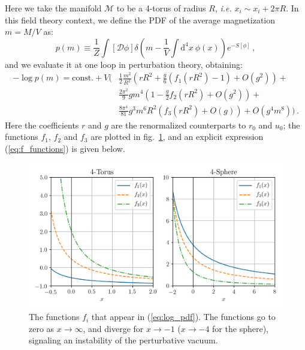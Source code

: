 \documentclass[11pt,a4paper]{article}
\newcommand{\dd}{\mathrm{d}}
\begin{document}
Here we take the manifold $\mathcal{M}$ to be a 4-torus of radius $R$,
\textit{i.e.} $x_i\sim x_i + 2\pi R$. In this field theory context, we define
the PDF of the average magnetization $m = M / V$ as:
\begin{equation}
    \label{eq:pdf_definition}
    p(m) \equiv \frac{1}{Z} \int \left[\mathcal{D}\phi\right]
    \delta\left(m - \frac{1}{V}\int\dd^4 x\ \phi(x)\right)
    e^{-S[\phi]}\,,
\end{equation}
and we evaluate it at one loop in perturbation theory, obtaining:
\begin{equation}
\label{eq:log_pdf}
\begin{split}
    -\log p(m) = \mathrm{const.} +  V\Bigg(
  &\frac{1}{2} \frac{m^2}{R^2} \left(
    r R^2 + \frac{g}{6} \left(f_1\left(r R^2\right) - 1\right)
    + O\left(g^2\right)\right) + \\
  & \frac{2\pi^2}{9}gm^4\left(
    1 - \frac{g}{2}f_2\left(r R^2\right)
    + O\left(g^2\right)\right) + \\
  & \frac{8\pi^4}{81} g^3 m^6 R^2\left(
    f_3\left(r R^2\right)
    + O\left(g\right)\right) + O\left(g^4m^8\right) \Bigg)\,.
\end{split}
\end{equation}
Here the coefficients $r$ and $g$ are the renormalized counterparts to $r_0$
and $u_0$; the functions $f_1$, $f_2$ and $f_3$ are plotted in
fig.~\ref{fig:f_functions}, and an explicit expression (\ref{eq:f_functions})
is given below.

\begin{figure}
\begin{center}
\includegraphics[scale=0.75]{f_functions.png}
\end{center}
\caption{\label{fig:f_functions} The functions $f_i$ that appear in
    (\ref{eq:log_pdf}). The functions go to zero as $x\to\infty$, and diverge
    for $x\to-1$ ($x\to-4$ for the sphere), signaling an instability of the
    perturbative vacuum.}
\end{figure}
\end{document}

